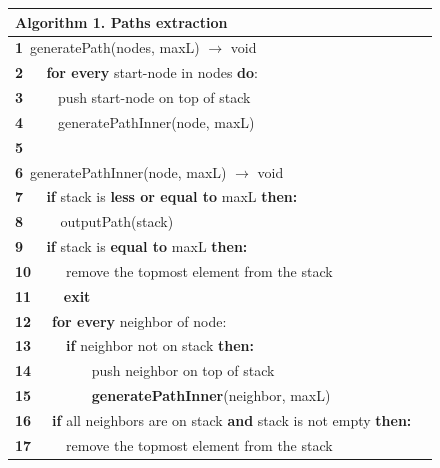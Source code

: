 \documentclass{l4proj}
\theoremstyle{definition}
\begin{document}
\begin{table}[h]
 \centering
 \label{Algorithm 1.}
 \begin{tabular}{l l}
	\textbf{Algorithm 1.} Paths extraction \\\hline
    \small\textbf{1}  \,\small{generatePath(nodes, maxL) $\rightarrow$ void}\\
    \small\textbf{2}  \,\,\,\,\,\,\,\,\small{\textbf{for every} start-node in nodes \textbf{do}:}\\
    \small\textbf{3}  \,\,\,\,\,\,\,\,\,\,\,\,\,\small{push start-node on top of stack}\\
    \small\textbf{4}  \,\,\,\,\,\,\,\,\,\,\,\,\,\small{generatePathInner(node, maxL)}\\
    \small\textbf{5}  \\
    \small\textbf{6}  \,\small{generatePathInner(node, maxL) $\rightarrow$ void}\\
    \small\textbf{7}  \,\,\,\,\,\,\,\,\small{\textbf{if} stack is \textbf{ less or equal to} maxL \textbf{then:}}\\
    \small\textbf{8}  \,\,\,\,\,\,\,\,\,\,\,\,\,\,\small{outputPath(stack)}\\
    \small\textbf{9}  \,\,\,\,\,\,\,\,\small{\textbf{if} stack is \textbf{equal to} maxL \textbf{then:}}\\
    \small\textbf{10} \,\,\,\,\,\,\,\,\,\,\,\,\,\small{remove the topmost element from the stack}\\
    \small\textbf{11} \,\,\,\,\,\,\,\,\,\,\,\,\small{\textbf{exit}}\\
    \small\textbf{12} \,\,\,\,\,\,\,\small{\textbf{for every} neighbor of node:}\\
    \small\textbf{13} \,\,\,\,\,\,\,\,\,\,\,\,\,\small{\textbf{if} neighbor not on stack \textbf{then:}}\\
    \small\textbf{14} \,\,\,\,\,\,\,\,\,\,\,\,\,\,\,\,\,\,\,\,\,\,\,\,\small{push neighbor on top of stack}\\
    \small\textbf{15} \,\,\,\,\,\,\,\,\,\,\,\,\,\,\,\,\,\,\,\,\,\,\,\,\small{\textbf{generatePathInner}(neighbor, maxL)}\\
    \small\textbf{16} \,\,\,\,\,\,\,\small{\textbf{if} all neighbors are on stack \textbf{and} stack is not empty \textbf{then:}}\\
    \small\textbf{17} \,\,\,\,\,\,\,\,\,\,\,\,\,\small{remove the topmost element from the stack}\\
    \hline
 \end{tabular}%
\end{table}
\end{document}
